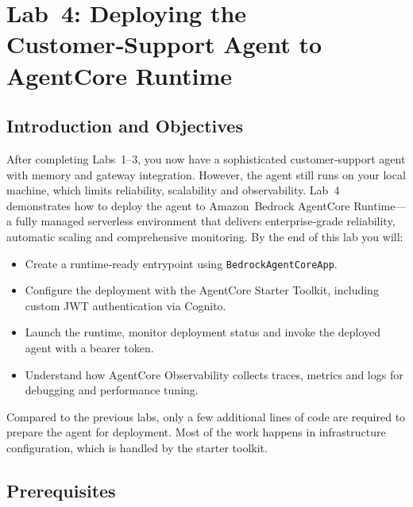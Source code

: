 
\chapter{Lab 4: Deploying the Customer‑Support Agent to AgentCore Runtime}
\label{chap:Lab 4: Deploying the Customer‑Support Agent to AgentCore Runtime}


\section{Introduction and Objectives}

After completing Labs 1–3, you now have a sophisticated customer‑support
agent with memory and gateway integration.  However, the agent still
runs on your local machine, which limits reliability, scalability and
observability.  Lab 4 demonstrates how to deploy the agent to
Amazon Bedrock AgentCore Runtime—a fully managed serverless environment
that delivers enterprise‑grade reliability, automatic scaling and
comprehensive monitoring.  By the end of this lab you will:

\begin{itemize}
  \item Create a runtime‑ready entrypoint using \texttt{BedrockAgentCoreApp}.
  \item Configure the deployment with the AgentCore Starter Toolkit,
        including custom JWT authentication via Cognito.
  \item Launch the runtime, monitor deployment status and invoke the
        deployed agent with a bearer token.
  \item Understand how AgentCore Observability collects traces,
        metrics and logs for debugging and performance tuning.
\end{itemize}

Compared to the previous labs, only a few additional lines of code are
required to prepare the agent for deployment.  Most of the work
happens in infrastructure configuration, which is handled by the
starter toolkit.

\section{Prerequisites}

